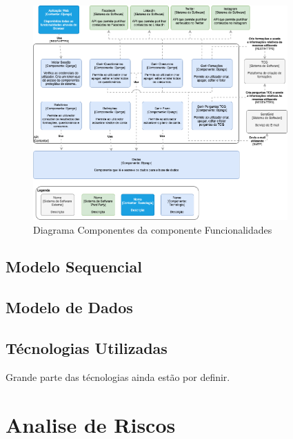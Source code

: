\begin{figure}[ht!]
	\begin{center}
		\includegraphics[width=0.87\textwidth]{img/arq/diagrama-componentes1}
		\caption{Diagrama Componentes da componente Funcionalidades}
		\label{fig:arq-componentes1}
	\end{center}
\end{figure}

\newpage

\subsection{Modelo Sequencial}

\subsection{Modelo de Dados}



\subsection{Técnologias Utilizadas}

Grande parte das técnologias ainda estão por definir.

\section{Analise de Riscos}
\label{analiseriscos}







\blankpage

\glsresetall

